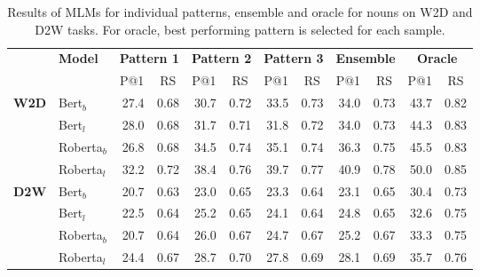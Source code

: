 \documentclass[11pt,a4paper]{article}
\begin{document}
\begin{table*}
    \centering
    \begin{tabular}{ll|rrrrrr|rr|rr}
        \cline{2-12} 
         & \multirow{2}{*}{\textbf{Model}} & \multicolumn{2}{c}{\textbf{Pattern 1}} & \multicolumn{2}{c}{\textbf{Pattern 2}} & \multicolumn{2}{c}{\textbf{Pattern 3}} & \multicolumn{2}{c}{\textbf{Ensemble}} & \multicolumn{2}{c}{\textbf{Oracle}} \\
         & & \multicolumn{1}{c}{P@1} & \multicolumn{1}{c}{RS} & \multicolumn{1}{c}{P@1} & \multicolumn{1}{c}{RS} & \multicolumn{1}{c}{P@1} & \multicolumn{1}{c}{RS} & \multicolumn{1}{c}{P@1} & \multicolumn{1}{c}{RS} & \multicolumn{1}{c}{P@1} & \multicolumn{1}{c}{RS} \\ \cline{2-12}
     \multirow{4}{*}{\textbf{W2D}} & Bert$_{b}$ & 27.4 & 0.68 & 30.7 & 0.72 & 33.5 & 0.73 & 34.0 & 0.73 & 43.7 & 0.82 \\
     & Bert$_{l}$ & 28.0 & 0.68 & 31.7 & 0.71 & 31.8 & 0.72 & 34.0 & 0.73 & 44.3 & 0.83 \\
     & Roberta$_{b}$ & 26.8 & 0.68 & 34.5 & 0.74 & 35.1 & 0.74 & 36.3 & 0.75 & 45.5 & 0.83 \\
     & Roberta$_{l}$ & 32.2 & 0.72 & 38.4 & 0.76 & 39.7 & 0.77 & 40.9 & 0.78 & 50.0 & 0.85 \\ \cline{2-12}
     \multirow{4}{*}{\textbf{D2W}} & Bert$_{b}$ & 20.7 & 0.63 & 23.0 & 0.65 & 23.3 & 0.64 & 23.1 & 0.65 & 30.4 & 0.73 \\
     & Bert$_{l}$ & 22.5 & 0.64 & 25.2 & 0.65 & 24.1 & 0.64 & 24.8 & 0.65 & 32.6 & 0.75 \\
     & Roberta$_{b}$ & 20.7 & 0.64 & 26.0 & 0.67 & 24.7 & 0.67 & 25.2 & 0.67 & 33.3 & 0.75 \\
     & Roberta$_{l}$ & 24.4 & 0.67 & 28.7 & 0.70 & 27.8 & 0.69 & 28.1 & 0.69 & 35.7 & 0.76 \\ \cline{2-12}
     
    \end{tabular}
    \caption{Results of MLMs for individual patterns, ensemble and oracle for nouns on W2D and D2W tasks. For oracle, best performing pattern is selected for each sample.}
    \label{tab:pattern_results_noun}
\end{table*}
\end{document}
